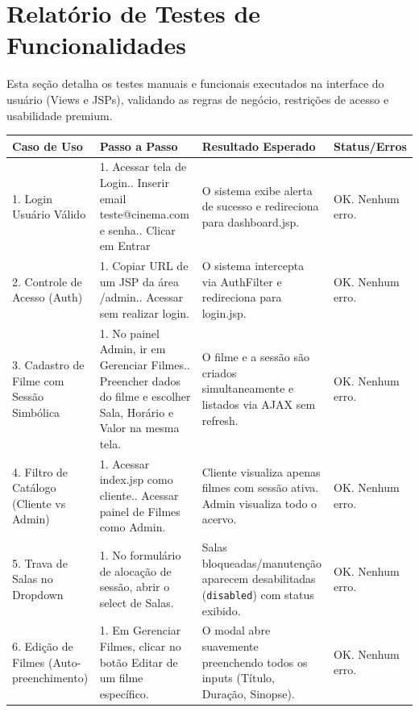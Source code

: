 \section{Relatório de Testes de Funcionalidades}

Esta seção detalha os testes manuais e funcionais executados na interface do usuário (Views e JSPs), validando as regras de negócio, restrições de acesso e usabilidade premium.

\begin{table}[h]
\centering
\small
\begin{tabular}{|p{3.5cm}|p{4.5cm}|p{4.5cm}|p{2.5cm}|}
\hline
\textbf{Caso de Uso} & \textbf{Passo a Passo} & \textbf{Resultado Esperado} & \textbf{Status/Erros} \\ \hline
1. Login Usuário Válido & 1. Acessar tela de Login.\newline 2. Inserir email teste@cinema.com e senha.\newline 3. Clicar em Entrar & O sistema exibe alerta de sucesso e redireciona para dashboard.jsp. & OK. Nenhum erro. \\ \hline
2. Controle de Acesso (Auth) & 1. Copiar URL de um JSP da área /admin.\newline 2. Acessar sem realizar login. & O sistema intercepta via AuthFilter e redireciona para login.jsp. & OK. Nenhum erro. \\ \hline
3. Cadastro de Filme com Sessão Simbólica & 1. No painel Admin, ir em Gerenciar Filmes.\newline 2. Preencher dados do filme e escolher Sala, Horário e Valor na mesma tela. & O filme e a sessão são criados simultaneamente e listados via AJAX sem refresh. & OK. Nenhum erro. \\ \hline
4. Filtro de Catálogo (Cliente vs Admin) & 1. Acessar index.jsp como cliente.\newline 2. Acessar painel de Filmes como Admin. & Cliente visualiza apenas filmes com sessão ativa. Admin visualiza todo o acervo. & OK. Nenhum erro. \\ \hline
5. Trava de Salas no Dropdown & 1. No formulário de alocação de sessão, abrir o select de Salas. & Salas bloqueadas/manutenção aparecem desabilitadas (\texttt{disabled}) com status exibido. & OK. Nenhum erro. \\ \hline
6. Edição de Filmes (Auto-preenchimento) & 1. Em Gerenciar Filmes, clicar no botão Editar de um filme específico. & O modal abre suavemente preenchendo todos os inputs (Título, Duração, Sinopse). & OK. Nenhum erro. \\ \hline

\end{tabular}
\end{table}

